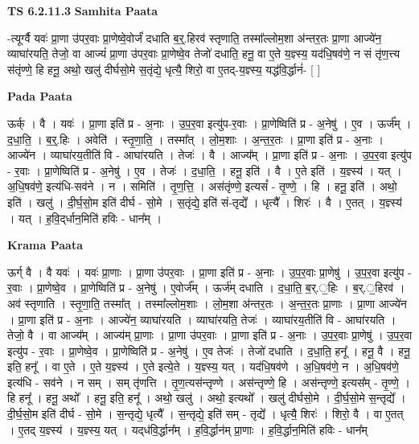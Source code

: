 \documentclass[17pt]{extarticle}
\begin{document}
\textbf{TS 6.2.11.3 } \newline
\textbf{Samhita Paata} \newline

-त्यूर्ग्वै यवः॑ प्रा॒णा उ॑पर॒वाः प्रा॒णेष्वे॒वोर्जं॑ दधाति ब॒र्॒.हिरव॑ स्तृणाति॒ तस्मा᳚ल्लोम॒शा अ॑न्तर॒तः प्रा॒णा आज्ये॑न॒ व्याघा॑रयति॒ तेजो॒ वा आज्यं॑ प्रा॒णा उ॑पर॒वाः प्रा॒णेष्वे॒व तेजो॑ दधाति॒ हनू॒ वा ए॒ते य॒ज्ञ्स्य॒ यद॑धि॒षव॑णे॒ न सं तृ॑ण॒त्त्य स॑तृंण्णे॒ हि हनू॒ अथो॒ खलु॑ दीर्घसो॒मे स॒तृंद्ये॒ धृत्यै॒ शिरो॒ वा ए॒तद्-य॒ज्ञ्स्य॒ यद्ध॑वि॒र्द्धानं॑- [  ] \newline

\textbf{Pada Paata} \newline

ऊर्क् । वै । यवः॑ । प्रा॒णा इति॑ प्र - अ॒नाः । उ॒प॒र॒वा इत्यु॑प-र॒वाः । प्रा॒णेष्विति॑ प्र - अ॒नेषु॑ । ए॒व । ऊर्ज᳚म् । द॒धा॒ति॒ । ब॒र्॒.हिः । अवेति॑ । स्तृ॒णा॒ति॒ । तस्मा᳚त् । लो॒म॒शाः । अ॒न्त॒र॒तः । प्रा॒णा इति॑ प्र - अ॒नाः । आज्ये॑न । व्याघा॑रय॒तीति॑ वि - आघा॑रयति । तेजः॑ । वै । आज्य᳚म् । प्रा॒णा इति॑ प्र - अ॒नाः । उ॒प॒र॒वा इत्यु॑प - र॒वाः । प्रा॒णेष्विति॑ प्र - अ॒नेषु॑ । ए॒व । तेजः॑ । द॒धा॒ति॒ । हनू॒ इति॑ । वै । ए॒ते इति॑ । य॒ज्ञ्स्य॑ । यत् । अ॒धि॒षव॑णे॒ इत्य॑धि-सव॑ने । न । समिति॑ । तृ॒ण॒त्ति॒ । अस॑तृंण्णे॒ इत्यसं᳚ - तृ॒ण्णे॒ । हि । हनू॒ इति॑ । अथो॒ इति॑ । खलु॑ । दी॒र्घ॒सो॒म इति॑ दीर्घ - सो॒मे । स॒तृंद्ये॒ इति॑ सं-तृद्ये᳚ । धृत्यै᳚ । शिरः॑ । वै । ए॒तत् । य॒ज्ञ्स्य॑ । यत् । ह॒वि॒द्‌र्धान॒मिति॑ हविः - धान᳚म् ।  \newline


\textbf{Krama Paata} \newline

ऊर्ग् वै । वै यवः॑ । यवः॑ प्रा॒णाः । प्रा॒णा उ॑पर॒वाः । प्रा॒णा इति॑ प्र - अ॒नाः । उ॒प॒र॒वाः प्रा॒णेषु॑ । उ॒प॒र॒वा इत्यु॑प - र॒वाः । प्रा॒णेष्वे॒व । प्रा॒णेष्विति॑ प्र - अ॒नेषु॑ । ए॒वोर्ज᳚म् । ऊर्ज॑म् दधाति । द॒धा॒ति॒ ब॒र्.॒हिः । ब॒र्.॒हिरव॑ । अव॑ स्तृणाति । स्तृ॒णा॒ति॒ तस्मा᳚त् । तस्मा᳚ल्लोम॒शाः । लो॒म॒शा अ॑न्तर॒तः । अ॒न्त॒र॒तः प्रा॒णाः । प्रा॒णा आज्ये॑न । प्रा॒णा इति॑ प्र - अ॒नाः । आज्ये॑न॒ व्याघा॑रयति । व्याघा॑रयति॒ तेजः॑ । व्याघा॑रय॒तीति॑ वि - आघा॑रयति । तेजो॒ वै । वा आज्य᳚म् । आज्य॑म् प्रा॒णाः । प्रा॒णा उ॑पर॒वाः । प्रा॒णा इति॑ प्र - अ॒नाः । उ॒प॒र॒वाः प्रा॒णेषु॑ । उ॒प॒र॒वा इत्यु॑प - र॒वाः । प्रा॒णेष्वे॒व । प्रा॒णेष्विति॑ प्र - अ॒नेषु॑ । ए॒व तेजः॑ । तेजो॑ दधाति । द॒धा॒ति॒ हनू᳚ । हनू॒ वै । हनू॒ इति॒ हनू᳚ । वा ए॒ते । ए॒ते य॒ज्ञ्स्य॑ । ए॒ते इत्ये॒ते । य॒ज्ञ्स्य॒ यत् । यद॑धि॒षव॑णे । अ॒धि॒षव॑णे॒ न । अ॒धि॒षव॑णे॒ इत्य॑धि - सव॑ने । न सम् । सम् तृ॑णत्ति । तृ॒ण॒त्यस॑न्तृण्णे । अस॑न्तृण्णे॒ हि । अस॑न्तृण्णे॒ इत्यस᳚म् - तृ॒ण्णे॒ । हि हनू᳚ । हनू॒ अथो᳚ । हनू॒ इति॒ हनू᳚ । अथो॒ खलु॑ । अथो॒ इत्यथो᳚ । खलु॑ दीर्घसो॒मे । दी॒र्घ॒सो॒मे स॒न्तृद्ये᳚ । दी॒र्घ॒सो॒म इति॑ दीर्घ - सो॒मे । स॒न्तृद्ये॒ धृत्यै᳚ । स॒न्तृद्ये॒ इति॑ सम् - तृद्ये᳚ । धृत्यै॒ शिरः॑ । शिरो॒ वै । वा ए॒तत् । ए॒तद् य॒ज्ञ्स्य॑ । य॒ज्ञ्स्य॒ यत् । यद्‍ध॑वि॒र्द्धान᳚म् । ह॒वि॒र्द्धान॑म् प्रा॒णाः । ह॒वि॒र्द्धान॒मिति॑ हविः - धान᳚म् \newline
\end{document}
